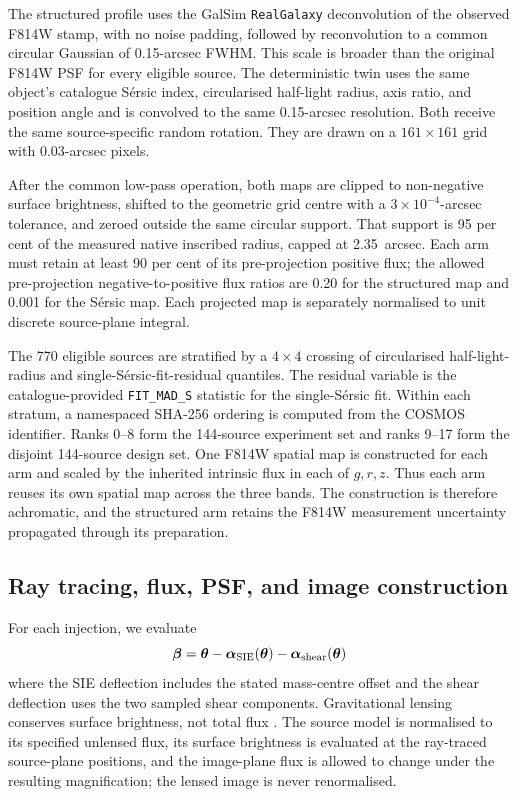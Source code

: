 The structured profile uses the GalSim \texttt{RealGalaxy} deconvolution of
the observed F814W stamp, with no noise padding, followed by reconvolution to
a common circular Gaussian of 0.15-arcsec FWHM. This scale is broader than
the original F814W PSF for every eligible source. The deterministic twin uses
the same object's catalogue S\'{e}rsic index, circularised half-light radius,
axis ratio, and position angle and is convolved to the same 0.15-arcsec
resolution. Both receive the same source-specific random rotation. They are
drawn on a \(161\times161\) grid with 0.03-arcsec pixels.

After the common low-pass operation, both maps are clipped to non-negative
surface brightness, shifted to the geometric grid centre with a
\(3\times10^{-4}\)-arcsec tolerance, and zeroed outside the same circular
support. That support is 95 per cent of the measured native inscribed radius,
capped at 2.35~arcsec. Each arm must retain at least 90 per cent of its
pre-projection positive flux; the allowed pre-projection
negative-to-positive flux ratios are 0.20 for the structured map and 0.001
for the S\'{e}rsic map. Each projected map is separately normalised to unit
discrete source-plane integral.

The 770 eligible sources are stratified by a \(4\times4\) crossing of
circularised half-light-radius and single-S\'{e}rsic-fit-residual quantiles.
The residual variable is the catalogue-provided \texttt{FIT\_MAD\_S}
statistic for the single-S\'{e}rsic fit.
Within each stratum, a namespaced SHA-256 ordering is computed from the COSMOS
identifier. Ranks 0--8 form the 144-source experiment set and ranks 9--17 form
the disjoint 144-source design set. One F814W spatial map is
constructed for each arm and scaled by the inherited intrinsic flux
in each of \(g,r,z\). Thus each arm reuses its own spatial map across the
three bands. The construction is therefore achromatic, and the structured
arm retains the F814W measurement uncertainty propagated through its
preparation.

\subsection{Ray tracing, flux, PSF, and image construction}
\label{sec:image_construction}

For each injection, we evaluate
\begin{equation}
\boldsymbol{\beta}
=
\boldsymbol{\theta}
-\boldsymbol{\alpha}_{\rm SIE}(\boldsymbol{\theta})
-\boldsymbol{\alpha}_{\rm shear}(\boldsymbol{\theta})
\label{eq:lens_equation}
\end{equation}
where the SIE deflection includes the stated mass-centre offset and the shear
deflection uses the two sampled shear components. Gravitational lensing
conserves surface brightness, not total flux
\citep{NarayanBartelmann1996}. The source model is normalised to its specified
unlensed flux, its surface brightness is evaluated at the ray-traced
source-plane positions, and the image-plane flux is allowed to change under
the resulting magnification; the lensed image is never renormalised.

